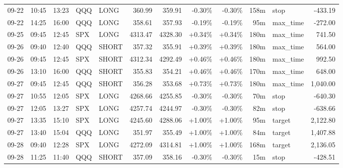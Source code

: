 \documentclass[11pt,a4paper,twoside]{article}
\begin{document}
\begin{center}
\begin{longtable}{>{\color{txtmain}}l l l l l r r r r r >{\color{txtmain}}l r}
09-22 & 10:45 & 13:23 & QQQ & LONG & 360.99 & 359.91 & \textcolor{lossred}{-0.30\%} & \textcolor{lossred}{-0.30\%} & 158m & stop & \textcolor{lossred}{-433.19} \\
09-22 & 14:25 & 16:00 & QQQ & LONG & 358.61 & 357.93 & \textcolor{lossred}{-0.19\%} & \textcolor{lossred}{-0.19\%} & 95m & max\_time & \textcolor{lossred}{-272.00} \\
09-25 & 09:45 & 12:45 & SPX & LONG & 4313.47 & 4328.30 & \textcolor{wingreen}{+0.34\%} & \textcolor{wingreen}{+0.34\%} & 180m & max\_time & \textcolor{wingreen}{741.50} \\
09-26 & 09:40 & 12:40 & QQQ & SHORT & 357.32 & 355.91 & \textcolor{wingreen}{+0.39\%} & \textcolor{wingreen}{+0.39\%} & 180m & max\_time & \textcolor{wingreen}{564.00} \\
09-26 & 09:45 & 12:45 & SPX & SHORT & 4312.34 & 4292.49 & \textcolor{wingreen}{+0.46\%} & \textcolor{wingreen}{+0.46\%} & 180m & max\_time & \textcolor{wingreen}{992.50} \\
09-26 & 13:10 & 16:00 & QQQ & SHORT & 355.83 & 354.21 & \textcolor{wingreen}{+0.46\%} & \textcolor{wingreen}{+0.46\%} & 170m & max\_time & \textcolor{wingreen}{648.00} \\
09-27 & 09:45 & 12:45 & QQQ & SHORT & 356.28 & 353.68 & \textcolor{wingreen}{+0.73\%} & \textcolor{wingreen}{+0.73\%} & 180m & max\_time & \textcolor{wingreen}{1,040.00} \\
09-27 & 10:55 & 12:05 & SPX & LONG & 4268.66 & 4255.85 & \textcolor{lossred}{-0.30\%} & \textcolor{lossred}{-0.30\%} & 70m & stop & \textcolor{lossred}{-640.30} \\
09-27 & 12:05 & 13:27 & SPX & LONG & 4257.74 & 4244.97 & \textcolor{lossred}{-0.30\%} & \textcolor{lossred}{-0.30\%} & 82m & stop & \textcolor{lossred}{-638.66} \\
09-27 & 13:35 & 15:10 & SPX & LONG & 4245.60 & 4288.06 & \textcolor{wingreen}{+1.00\%} & \textcolor{wingreen}{+1.00\%} & 95m & target & \textcolor{wingreen}{2,122.80} \\
09-27 & 13:40 & 15:04 & QQQ & LONG & 351.97 & 355.49 & \textcolor{wingreen}{+1.00\%} & \textcolor{wingreen}{+1.00\%} & 84m & target & \textcolor{wingreen}{1,407.88} \\
09-28 & 09:40 & 12:28 & SPX & LONG & 4272.09 & 4314.81 & \textcolor{wingreen}{+1.00\%} & \textcolor{wingreen}{+1.00\%} & 168m & target & \textcolor{wingreen}{2,136.05} \\
09-28 & 11:25 & 11:40 & QQQ & SHORT & 357.09 & 358.16 & \textcolor{lossred}{-0.30\%} & \textcolor{lossred}{-0.30\%} & 15m & stop & \textcolor{lossred}{-428.51} \\

\end{longtable}
\end{center}
\end{document}
